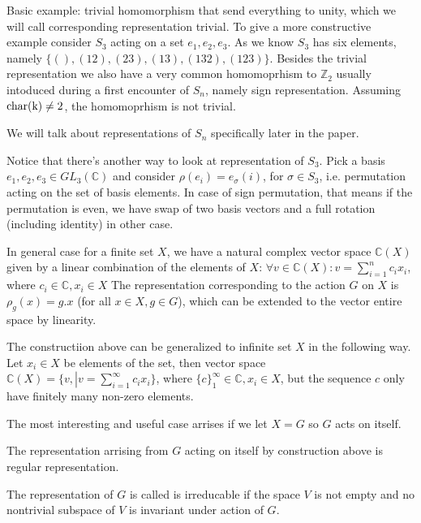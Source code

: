 \documentclass{amsart}
\def\char{\rm char}
\begin{document}
Basic example:  trivial homomorphism that send everything to unity, which we will call corresponding representation trivial. 
To give a more constructive example consider $S_3$ acting on a set $e_1, e_2, e_3$.
As we know $S_3$ has six elements, namely $\{ (), (12), (23), (13), (132), (123) \}$. 
Besides the trivial representation we also have a very common homomoprhism to $\mathbb{Z}_2$ usually intoduced during a first encounter of $S_n$, namely sign representation.
Assuming $\char(k) \neq 2$, the homomoprhism is not trivial. 


We will talk about representations of $S_n$ specifically later in the paper.

Notice that there's another way to look at representation of $S_3$. Pick a basis $e_1, e_2, e_3 \in GL_3 (\mathbb C)$ and consider $\rho (e_i) = e_\sigma(i)$, for $\sigma \in S_3$, i.e. permutation acting on the set of basis elements. In case of sign permutation, that means 
if the permutation is even, we have swap of two basis vectors and a full rotation (including identity) in other case.

In general case for a finite set $X$, we have a natural complex vector space $\mathbb{C}(X)$ given by a linear combination of the elements of $X$:
$\forall v \in \mathbb{C}(X): v = \sum_{i=1}^n c_i x_i$, where $c_i \in \mathbb{C}, x_i \in X$
The representation corresponding to the action $G$ on $X$ is $\rho_g (x) = g . x$ (for all $x\in X, g \in G$), which can be extended to the vector entire space by linearity.

\begin{note}
    The constructiion above can be generalized to infinite set $X$ in the following way.
    Let $x_i \in X$ be elements of the set, 
    then vector space $\mathbb{C}(X)=\{ v, \left. \right| v = \sum_{i=1}^\infty c_i x_i\}$, where $ \{c\}_1^\infty \in \mathbb{C}, x_i \in X$, 
    but the sequence $c$ only have finitely many non-zero elements.
\end{note}

The most interesting and useful case arrises if we let $X = G$ so $G$ acts on itself.

\begin{definition}
The representation arrising from $G$ acting on itself by construction above is regular representation.
\end{definition}

\begin{definition}

The representation of $G$ is called is irreducable if the space $V$ is not empty and no nontrivial subspace of $V$ is invariant under action of $G$.
    
\end{definition}
\end{document}
